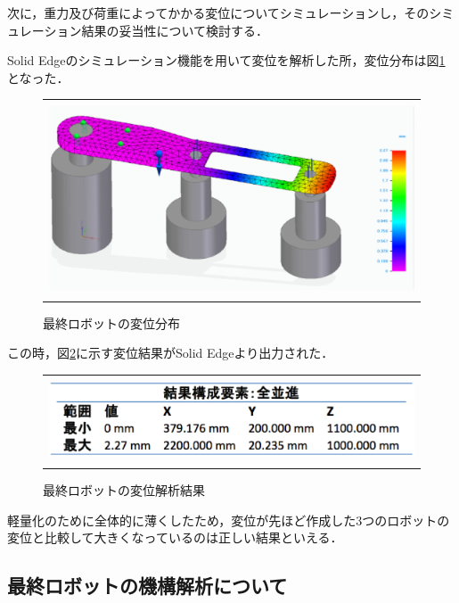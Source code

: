 次に，重力及び荷重によってかかる変位についてシミュレーションし，そのシミュレーション結果の妥当性について検討する．

Solid
Edgeのシミュレーション機能を用いて変位を解析した所，変位分布は図\ref{last-heni}となった．

\begin{figure}[htbp]
  \begin{center}
    \begin{tabular}{c}
      \includegraphics[height=5.7cm]{img/eps/last-heni.eps}
    \end{tabular}
    \caption{最終ロボットの変位分布}
    \label{last-heni}
  \end{center}
\end{figure}

この時，図\ref{last-heni-result}に示す変位結果がSolid
Edgeより出力された．

\begin{figure}[htbp]
  \begin{center}
    \begin{tabular}{c}
      \includegraphics[height=2.5cm]{img/eps/last-heni-result.eps}
    \end{tabular}
    \caption{最終ロボットの変位解析結果}
    \label{last-heni-result}
  \end{center}
\end{figure}

軽量化のために全体的に薄くしたため，変位が先ほど作成した3つのロボットの変位と比較して大きくなっているのは正しい結果といえる．

\subsection{最終ロボットの機構解析について}\label{ux6700ux7d42ux30edux30dcux30c3ux30c8ux306eux6a5fux69cbux89e3ux6790ux306bux3064ux3044ux3066}

